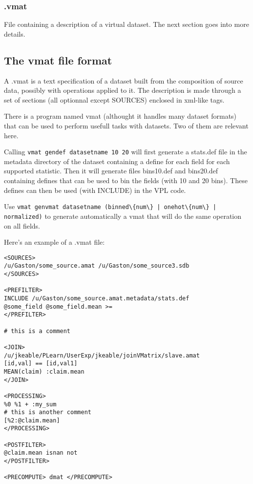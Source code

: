 \documentclass[11pt]{book}
\begin{document}
\subsubsection{.vmat}

File containing a description of a virtual dataset. The next section goes into more details.

\subsection{The vmat file format}

A .vmat is a text specification of a dataset built from the composition of source data, possibly with operations applied to it. The description is made through a set of sections (all optionnal except SOURCES) enclosed in xml-like tags.

There is a program named vmat (althought it handles many dataset formats) that can be used to perform usefull tasks with datasets. Two of them are relevant here. 

Calling \verb!vmat gendef datasetname 10 20! will first generate a stats.def file in the metadata directory of the dataset containing a define for each field for each supported statistic. Then it will generate files bins10.def and bins20.def containing defines that can be used to bin the fields (with 10 and 20 bins). These defines can then be used (with INCLUDE) in the VPL code.

Use \verb!vmat genvmat datasetname (binned\{num\} | onehot\{num\} | normalized)! to generate automatically a vmat that will do the same operation on all fields.

Here's an example of a .vmat file:
\begin{verbatim}
<SOURCES>
/u/Gaston/some_source.amat /u/Gaston/some_source3.sdb
</SOURCES>

<PREFILTER>
INCLUDE /u/Gaston/some_source.amat.metadata/stats.def
@some_field @some_field.mean >=
</PREFILTER>

# this is a comment

<JOIN>
/u/jkeable/PLearn/UserExp/jkeable/joinVMatrix/slave.amat
[id,val] == [id,val1]
MEAN(claim) :claim.mean
</JOIN>

<PROCESSING>
%0 %1 + :my_sum
# this is another comment
[%2:@claim.mean]
</PROCESSING>

<POSTFILTER>
@claim.mean isnan not
</POSTFILTER>

<PRECOMPUTE> dmat </PRECOMPUTE>
\end{verbatim}
\end{document}
